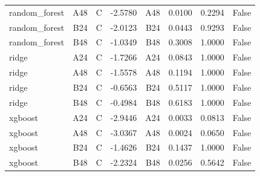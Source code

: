 \begin{table}[htbp]
\begin{tabular}{lrrrrrrr}
random\_forest & A48 & C & -2.5780 & A48 & 0.0100 & 0.2294 & False \\
random\_forest & B24 & C & -2.0123 & B24 & 0.0443 & 0.9293 & False \\
random\_forest & B48 & C & -1.0349 & B48 & 0.3008 & 1.0000 & False \\
ridge & A24 & C & -1.7266 & A24 & 0.0843 & 1.0000 & False \\
ridge & A48 & C & -1.5578 & A48 & 0.1194 & 1.0000 & False \\
ridge & B24 & C & -0.6563 & B24 & 0.5117 & 1.0000 & False \\
ridge & B48 & C & -0.4984 & B48 & 0.6183 & 1.0000 & False \\
xgboost & A24 & C & -2.9446 & A24 & 0.0033 & 0.0813 & False \\
xgboost & A48 & C & -3.0367 & A48 & 0.0024 & 0.0650 & False \\
xgboost & B24 & C & -1.4626 & B24 & 0.1437 & 1.0000 & False \\
xgboost & B48 & C & -2.2324 & B48 & 0.0256 & 0.5642 & False \\
\bottomrule
\end{tabular}
\end{table}
